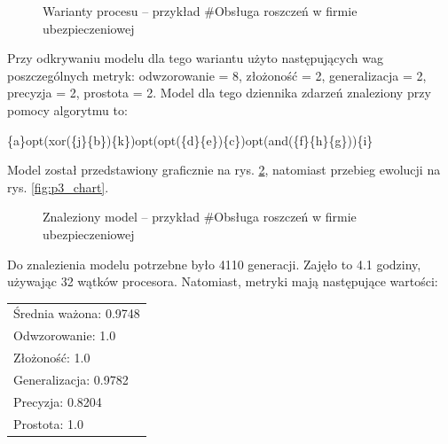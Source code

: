 \begin{figure}[H]
	\caption{\label{fig:p3_variants}Warianty procesu -- przykład \#Obsługa roszczeń w firmie ubezpieczeniowej}
\end{figure}

Przy odkrywaniu modelu dla tego wariantu użyto następujących wag poszczególnych metryk: odwzorowanie = 8, złożoność = 2, generalizacja = 2, precyzja = 2, prostota = 2. Model dla tego dziennika zdarzeń znaleziony przy pomocy algorytmu to:
\begin{center}
	\{a\}opt(xor(\{j\}\{b\})\{k\})opt(opt(\{d\}\{e\})\{c\})opt(and(\{f\}\{h\}\{g\}))\{i\}
\end{center}
Model został przedstawiony graficznie na rys. \ref{fig:p3_model}, natomiast przebieg ewolucji na rys. \ref{fig:p3_chart}.

\begin{figure}[H]
	\caption{\label{fig:p3_model}Znaleziony model -- przykład \#Obsługa roszczeń w firmie ubezpieczeniowej}
\end{figure}

Do znalezienia modelu potrzebne było 4110 generacji. Zajęło to 4.1 godziny, używając 32 wątków procesora. Natomiast, metryki mają następujące wartości: 

 \begin{center}
  \begin{tabular}{l}
	Średnia ważona: 0.9748 \\
	Odwzorowanie: 1.0 \\
	Złożoność: 1.0 \\
	Generalizacja: 0.9782 \\
	Precyzja: 0.8204 \\
	Prostota: 1.0
  \end{tabular}
 \end{center}
 
